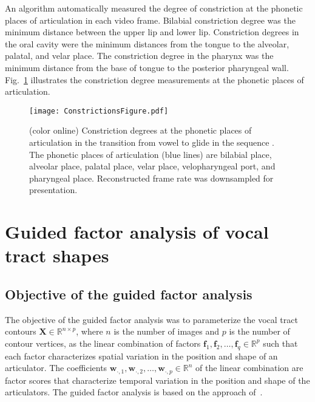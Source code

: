 \documentclass[preprint]{JASAnew}
\begin{document}
An algorithm automatically measured the degree of constriction at the phonetic places of articulation in each video frame. Bilabial constriction degree was the minimum distance between the upper lip and lower lip. Constriction degrees in the oral cavity were the minimum distances from the tongue to the alveolar, palatal, and velar place. The constriction degree in the pharynx was the minimum distance from the base of tongue to the posterior pharyngeal wall. 
%
Fig.~\ref{fig:constrictions} illustrates the constriction degree measurements at the phonetic places of articulation.


\begin{figure}

\texttt{[image: ConstrictionsFigure.pdf]}

\caption{(color online) Constriction degrees at the phonetic places of articulation in the transition from vowel \textipa{[a]} to glide \textipa{[j]} in the sequence \textipa{[aja]}. The phonetic places of articulation (blue lines) are bilabial place, alveolar place, palatal place, velar place, velopharyngeal port, and pharyngeal place. Reconstructed frame rate was downsampled for presentation.}
\label{fig:constrictions}
\end{figure}




\section{Guided factor analysis of vocal tract shapes}
\label{sec:gfa}




\subsection{Objective of the guided factor analysis}
\label{subsec:objectivesoftheguidedfactoranalysis}

The objective of the guided factor analysis was to parameterize the vocal tract contours $\mathbf{X} \in \mathbb{R}^{n\times p}$, where $n$ is the number of images and $p$ is the number of contour vertices, as the linear combination of factors $\mathbf{f}_1, \mathbf{f}_2, \ldots, \mathbf{f}_q \in \mathbb{R}^p$ such that each factor characterizes spatial variation in the position and shape of an articulator. 
%
The coefficients $\mathbf{w}_{\cdot,1},\mathbf{w}_{\cdot,2},\ldots,\mathbf{w}_{\cdot,p} \in \mathbb{R}^n$ of the linear combination are factor scores that characterize temporal variation in the position and shape of the articulators. 
%
The guided factor analysis is based on the approach of~\citet{toutios2015factor}.
\end{document}
